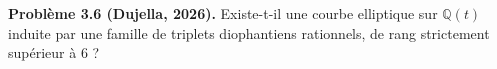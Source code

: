 \textbf{Problème 3.6 (Dujella, 2026).} Existe-t-il une courbe elliptique sur $\mathbb{Q}(t)$ induite par une famille de triplets diophantiens rationnels, de rang strictement supérieur à 6 ?
